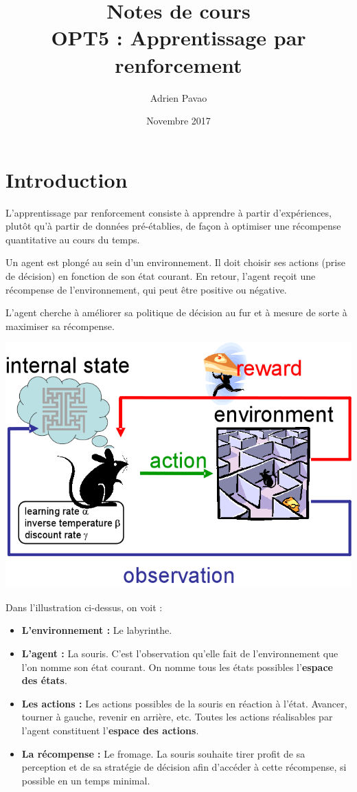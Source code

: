 \documentclass{article}
\title{Notes de cours\\OPT5 : Apprentissage par renforcement}
\author{Adrien Pavao}
\date{Novembre 2017}
\begin{document}
\maketitle

\section{Introduction}

L'apprentissage par renforcement consiste à apprendre à partir d'expériences, plutôt qu'à partir de données pré-établies, de façon à optimiser une récompense quantitative au cours du temps.

Un agent est plongé au sein d'un environnement. Il doit choisir ses actions (prise de décision) en fonction de son état courant. En retour, l'agent reçoit une récompense de l'environnement, qui peut être positive ou négative.

L'agent cherche à améliorer sa politique de décision au fur et à mesure de sorte à maximiser sa récompense.

\includegraphics[scale=0.4]{opt5.png}

Dans l'illustration ci-dessus, on voit :
\begin{itemize}
\item \textbf{L'environnement :} Le labyrinthe.
\item \textbf{L'agent :} La souris. C'est l'observation qu'elle fait de l'environnement que l'on nomme son état courant. On nomme tous les états possibles l'\textbf{espace des états}.
\item \textbf{Les actions :} Les actions possibles de la souris en réaction à l'état. Avancer, tourner à gauche, revenir en arrière, etc. Toutes les actions réalisables par l'agent constituent l'\textbf{espace des actions}.
\item \textbf{La récompense :} Le fromage. La souris souhaite tirer profit de sa perception et de sa stratégie de décision afin d'accéder à cette récompense, si possible en un temps minimal.
\end{itemize}
\end{document}
